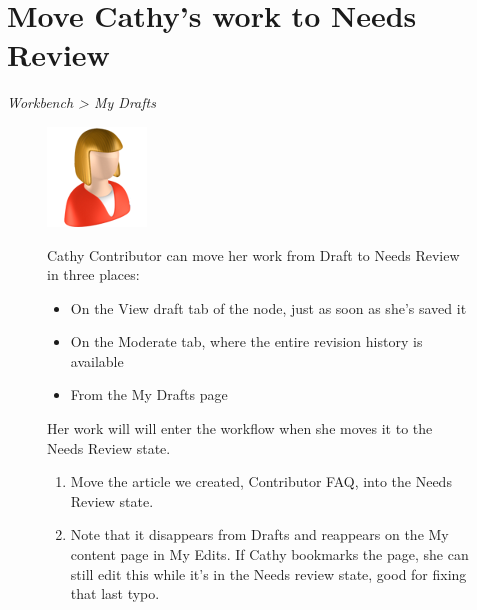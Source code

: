 \documentclass[letterpaper,10pt,english]{sphinxmanual}
\begin{document}
\section{Move Cathy's work to Needs Review}
\label{moderation:move-cathy-s-work-to-needs-review}
\emph{Workbench \textgreater{} My Drafts}
\begin{figure}[htbp]
\centering

\includegraphics{sites/default/files/recipes/user_icons/contributor.png}
{\small 
Cathy Contributor can move her work from Draft to Needs Review in three places:
\begin{itemize}
\item {} 
On the View draft tab of the node, just as soon as she's saved it

\item {} 
On the Moderate tab, where the entire revision history is available

\item {} 
From the My Drafts page

\end{itemize}

Her work will will enter the workflow when she moves it to the Needs Review state.
\begin{enumerate}
\item {} 
Move the article we created, Contributor FAQ, into the Needs Review state.

\end{enumerate}
\begin{enumerate}
\setcounter{enumi}{1}
\item {} 
Note that it disappears from Drafts and reappears on the My content page in My Edits. If Cathy bookmarks the page, she can still edit this while it's in the Needs review state, good for fixing that last typo.

\end{enumerate}
}\end{figure}
\end{document}
